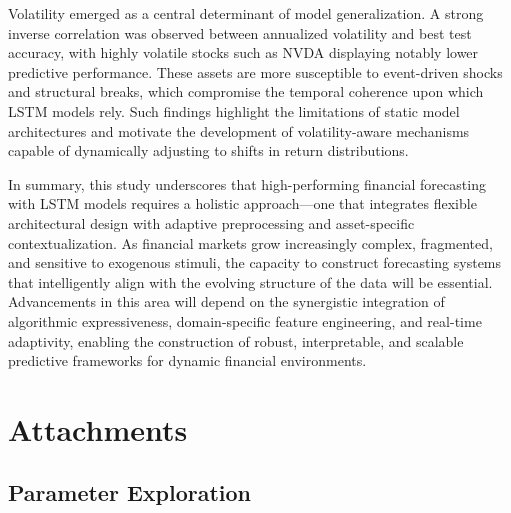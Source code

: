 \documentclass[letterpaper]{article}
\begin{document}
Volatility emerged as a central determinant of model generalization. A strong inverse correlation was observed between annualized volatility and best test accuracy, with highly volatile stocks such as NVDA displaying notably lower predictive performance. These assets are more susceptible to event-driven shocks and structural breaks, which compromise the temporal coherence upon which LSTM models rely. Such findings highlight the limitations of static model architectures and motivate the development of volatility-aware mechanisms capable of dynamically adjusting to shifts in return distributions.


In summary, this study underscores that high-performing financial forecasting with LSTM models requires a holistic approach—one that integrates flexible architectural design with adaptive preprocessing and asset-specific contextualization. As financial markets grow increasingly complex, fragmented, and sensitive to exogenous stimuli, the capacity to construct forecasting systems that intelligently align with the evolving structure of the data will be essential. Advancements in this area will depend on the synergistic integration of algorithmic expressiveness, domain-specific feature engineering, and real-time adaptivity, enabling the construction of robust, interpretable, and scalable predictive frameworks for dynamic financial environments.

\newpage

\section{Attachments}

\subsection{Parameter Exploration}\label{subsec:parameter_exploration}
\end{document}
